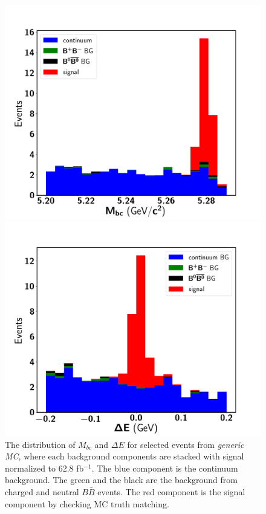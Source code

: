 \begin{figure}[htpb]
	\begin{minipage}[b]{0.5\linewidth}
		\centering 
		\includegraphics[width=1\linewidth]{figures/hist_stacked_generic_mbc_oldksfinder}
	\end{minipage}
	\begin{minipage}[b]{0.5\linewidth}
		\centering 
		\includegraphics[width=1\linewidth]{figures/hist_stacked_generic_dE_oldksfinder}
	\end{minipage}
	\caption{The distribution  of $M_{bc}$ and $\Delta E$ for selected events from \textit{generic MC}, where each background components are stacked with signal normalized to 62.8 fb$^{-1}$. The blue component is the continuum background. The green and the black are the background from charged and neutral $B\bar{B}$ events. The red component is the signal component by checking MC truth matching. }
	\label{fig:2Dgenstack}
\end{figure}
